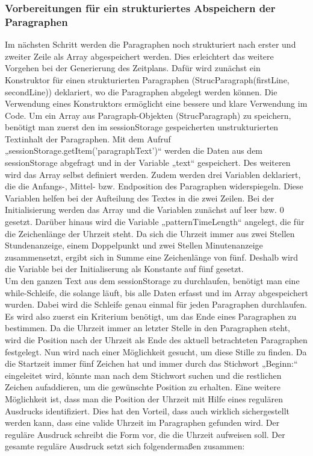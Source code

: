 {\subsubsection{Vorbereitungen für ein strukturiertes Abspeichern der Paragraphen}
Im nächsten Schritt werden die Paragraphen noch strukturiert nach erster und zweiter Zeile als Array abgespeichert werden. Dies erleichtert das weitere Vorgehen bei der Generierung des Zeitplans. Dafür wird zunächst ein Konstruktor für einen strukturierten Paragraphen (StrucParagraph(firstLine, secondLine)) deklariert, wo die Paragraphen abgelegt werden können. Die Verwendung eines Konstruktors ermöglicht eine bessere und klare Verwendung im Code. Um ein Array aus Paragraph-Objekten (StrucParagraph) zu speichern, benötigt man zuerst den im sessionStorage gespeicherten unstrukturierten Textinhalt der Paragraphen. Mit dem Aufruf „sessionStorage.getItem('paragraphText')“ werden die Daten aus dem sessionStorage abgefragt und in der Variable „text“ gespeichert. Des weiteren wird das Array selbst definiert werden. Zudem werden drei Variablen deklariert, die die Anfangs-, Mittel- bzw. Endposition des Paragraphen widerspiegeln. Diese Variablen helfen bei der Aufteilung des Textes in die zwei Zeilen. Bei der Initialisierung werden das Array und die Variablen zunächst auf leer bzw. 0 gesetzt. Darüber hinaus wird die Variable „patternTimeLength“ angelegt, die für die Zeichenlänge der Uhrzeit steht. Da sich die Uhrzeit immer aus zwei Stellen Stundenanzeige, einem Doppelpunkt und zwei Stellen Minutenanzeige zusammensetzt, ergibt sich in Summe eine Zeichenlänge von fünf. Deshalb wird die Variable bei der Initialiserung als Konstante auf fünf gesetzt.\\
Um den ganzen Text aus dem sessionStorage zu durchlaufen, benötigt man eine while-Schleife, die solange läuft, bis alle Daten erfasst und im Array abgespeichert wurden. Dabei wird die Schleife genau einmal für jeden Paragraphen durchlaufen. Es wird also zuerst ein Kriterium benötigt, um das Ende eines Paragraphen zu bestimmen. Da die Uhrzeit immer an letzter Stelle in den Paragraphen steht, wird die Position nach der Uhrzeit als Ende des aktuell betrachteten Paragraphen festgelegt. Nun wird nach einer Möglichkeit gesucht, um diese Stille zu finden. Da die Startzeit immer fünf Zeichen hat und immer durch das Stichwort „Beginn:“ eingeleitet wird, könnte man nach dem Stichwort suchen und die restlichen Zeichen aufaddieren, um die gewünschte Position zu erhalten. Eine weitere Möglichkeit ist, dass man die Position der Uhrzeit mit Hilfe eines regulären Ausdrucks identifiziert. Dies hat den Vorteil, dass auch wirklich sichergestellt werden kann, dass eine valide Uhrzeit im Paragraphen gefunden wird. Der reguläre Ausdruck schreibt die Form vor, die die Uhrzeit aufweisen soll. Der gesamte reguläre Ausdruck setzt sich folgendermaßen zusammen:
}
